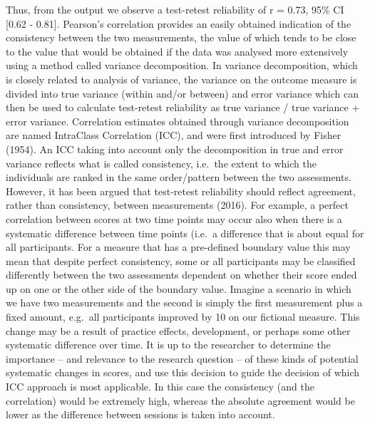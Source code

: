 \documentclass[english,,man,floatsintext]{apa6}
\begin{document}
Thus, from the output we observe a test-retest reliability of r = 0.73, 95\% CI {[}0.62 - 0.81{]}. Pearson's correlation provides an easily obtained indication of the consistency between the two measurements, the value of which tends to be close to the value that would be obtained if the data was analysed more extensively using a method called variance decomposition. In variance decomposition, which is closely related to analysis of variance, the variance on the outcome measure is divided into true variance (within and/or between) and error variance which can then be used to calculate test-retest reliability as true variance / true variance + error variance. Correlation estimates obtained through variance decomposition are named IntraClass Correlation (ICC), and were first introduced by Fisher (1954). An ICC taking into account only the decomposition in true and error variance reflects what is called consistency, i.e.~the extent to which the individuals are ranked in the same order/pattern between the two assessments. However, it has been argued that test-retest reliability should reflect agreement, rather than consistency, between measurements (2016). For example, a perfect correlation between scores at two time points may occur also when there is a systematic difference between time points (i.e.~a difference that is about equal for all participants. For a measure that has a pre-defined boundary value this may mean that despite perfect consistency, some or all participants may be classified differently between the two assessments dependent on whether their score ended up on one or the other side of the boundary value. Imagine a scenario in which we have two measurements and the second is simply the first measurement plus a fixed amount, e.g.~all participants improved by 10 on our fictional measure. This change may be a result of practice effects, development, or perhaps some other systematic difference over time. It is up to the researcher to determine the importance -- and relevance to the research question -- of these kinds of potential systematic changes in scores, and use this decision to guide the decision of which ICC approach is most applicable. In this case the consistency (and the correlation) would be extremely high, whereas the absolute agreement would be lower as the difference between sessions is taken into account.
\end{document}

